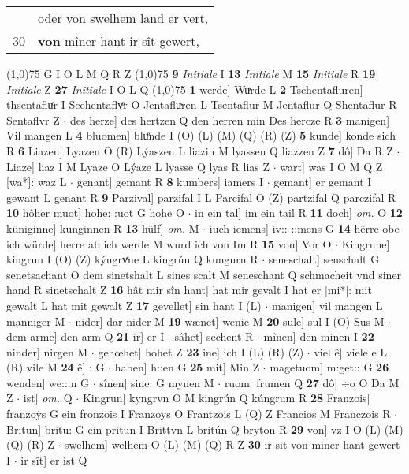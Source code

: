 \documentclass[8pt,a4paper,notitlepage]{article}
\begin{document}
\begin{table}[ht]
\begin{minipage}[t]{0.5\linewidth}
\begin{tabular}{rl}
 & oder von swelhem land er vert,\\ 
30 & \textbf{von} mîner hant ir sît gewert,\\ 
\end{tabular}
\scriptsize
\line(1,0){75} \newline
G I O L M Q R Z \newline
\line(1,0){75} \newline
\textbf{9} \textit{Initiale} I  \textbf{13} \textit{Initiale} M  \textbf{15} \textit{Initiale} R  \textbf{19} \textit{Initiale} Z  \textbf{27} \textit{Initiale} I O L Q  \newline
\line(1,0){75} \newline
\textbf{1} werde] Wuͯrde L \textbf{2} Tschentafluren] thsentafluͦr I Scehentaflvͦr O Jentafluͯren L Tsentaflur M Jentaflur Q Shentaflur R Sentaflvr Z  $\cdot$ des herze] des hertzen Q den herren min Des hercze R \textbf{3} manigen] Vil mangen L \textbf{4} bluomen] bluͤnde I (O) (L) (M) (Q) (R) (Z) \textbf{5} kunde] konde sich R \textbf{6} Liazen] Lyazen O (R) Lýaszen L liazin M lyassen Q liazzen Z \textbf{7} dô] Da R Z  $\cdot$ Liaze] liaz I M Lyaze O Lýaze L lyasse Q lyas R lias Z  $\cdot$ wart] was I O M Q Z [wa*]: waz L  $\cdot$ genant] gemant R \textbf{8} kumbers] iamers I  $\cdot$ gemant] er gemant I gewant L genant R \textbf{9} Parzival] parzifal I L Parcifal O (Z) partzifal Q parczifal R \textbf{10} hôher muot] hohe: :uot G hohe O  $\cdot$ in ein tal] im ein tail R \textbf{11} doch] \textit{om.} O \textbf{12} küniginne] kunginnen R \textbf{13} hülf] \textit{om.} M  $\cdot$ iuch iemens] iv:: ::mens G \textbf{14} hêrre obe ich würde] herre ab ich werde M wurd ich von Im R \textbf{15} von] Vor O  $\cdot$ Kingrune] kingrun I (O) (Z) kýngrvͯne L kingrún Q kungurn R  $\cdot$ seneschalt] senschalt G senetsachant O dem sinetshalt L sines scalt M seneschant Q schmacheit vnd siner hand R sinetschalt Z \textbf{16} hât mir sîn hant] hat mir gevalt I hat er [mi*]: mit gewalt L hat mit gewalt Z \textbf{17} gevellet] sin hant I (L)  $\cdot$ manigen] vil mangen L manniger M  $\cdot$ nider] dar nider M \textbf{19} wænet] wenic M \textbf{20} sule] sul I (O) Sus M  $\cdot$ dem arme] den arm Q \textbf{21} ir] er I  $\cdot$ sâhet] sechent R  $\cdot$ mînen] den minen I \textbf{22} ninder] nirgen M  $\cdot$ gehœhet] hohet Z \textbf{23} ine] ich I (L) (R) (Z)  $\cdot$ viel ê] viele e L (R) vile M \textbf{24} ê] : G  $\cdot$ haben] h::en G \textbf{25} mit] Min Z  $\cdot$ magetuom] m:get:: G \textbf{26} wenden] we:::n G  $\cdot$ sînen] sine: G mynen M  $\cdot$ ruom] frumen Q \textbf{27} dô] ÷o O Da M Z  $\cdot$ ist] \textit{om.} Q  $\cdot$ Kingrun] kyngrvn O M kingrún Q kúngrum R \textbf{28} Franzois] franzoẏs G ein fronzois I Franzoys O Frantzois L (Q) Z Francios M Franczois R  $\cdot$ Britun] britu: G ein pritun I Brittvn L britún Q bryton R \textbf{29} von] vz I O (L) (M) (Q) (R) Z  $\cdot$ swelhem] welhem O (L) (M) (Q) R Z \textbf{30} ir sit von miner hant gewert I  $\cdot$ ir sît] er ist Q \newline

\end{minipage}
\end{table}
\end{document}
